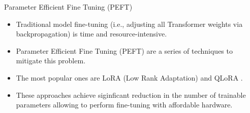 \documentclass[handout]{beamer}
\begin{document}





\begin{frame}{Parameter Efficient Fine Tuning (PEFT)}
\begin{scriptsize}
\begin{itemize}
    \item Traditional model fine-tuning (i.e., adjusting all Transformer weights via backpropagation) is time and resource-intensive.
    \item Parameter Efficient Fine Tuning (PEFT) are a series of techniques to mitigate this problem.
    \item The most popular ones are LoRA (Low Rank Adaptation) \cite{hu2021lora} and QLoRA \cite{dettmers2023qlora}.
    \item These approaches achieve siginficant reduction in the number of trainable parameters allowing to perform fine-tuning with affordable hardware.
\end{itemize}
\end{scriptsize}
\end{frame}
\end{document}
